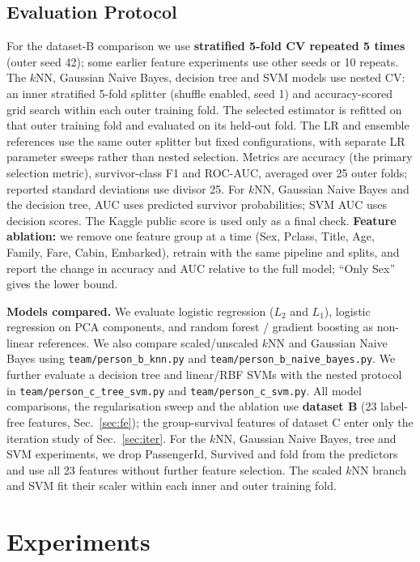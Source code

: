\documentclass[10pt,twocolumn]{article}
\begin{document}
\subsection{Evaluation Protocol}
For the dataset-B comparison we use \textbf{stratified 5-fold CV repeated 5 times} (outer seed 42); some earlier feature experiments use other seeds or 10 repeats. The $k$NN, Gaussian Naive Bayes, decision tree and SVM models use nested CV: an inner stratified 5-fold splitter (shuffle enabled, seed 1) and accuracy-scored grid search within each outer training fold. The selected estimator is refitted on that outer training fold and evaluated on its held-out fold. The LR and ensemble references use the same outer splitter but fixed configurations, with separate LR parameter sweeps rather than nested selection. Metrics are accuracy (the primary selection metric), survivor-class F1 and ROC-AUC, averaged over 25 outer folds; reported standard deviations use divisor 25. For $k$NN, Gaussian Naive Bayes and the decision tree, AUC uses predicted survivor probabilities; SVM AUC uses decision scores. The Kaggle public score is used only as a final check. \textbf{Feature ablation:} we remove one feature group at a time (Sex, Pclass, Title, Age, Family, Fare, Cabin, Embarked), retrain with the same pipeline and splits, and report the change in accuracy and AUC relative to the full model; ``Only Sex'' gives the lower bound.

\textbf{Models compared.} We evaluate logistic regression ($L_2$ and $L_1$), logistic regression on PCA components, and random forest / gradient boosting as non-linear references.
We also compare scaled/unscaled $k$NN and Gaussian Naive Bayes using \texttt{team/person\_b\_knn.py} and \texttt{team/person\_b\_naive\_bayes.py}.
We further evaluate a decision tree and linear/RBF SVMs with the nested protocol in \texttt{team/person\_c\_tree\_svm.py} and \texttt{team/person\_c\_svm.py}.
All model comparisons, the regularisation sweep and the ablation use \textbf{dataset B} (23 label-free features, Sec.~\ref{sec:fe}); the group-survival features of dataset C enter only the iteration study of Sec.~\ref{sec:iter}.
For the $k$NN, Gaussian Naive Bayes, tree and SVM experiments, we drop PassengerId, Survived and fold from the predictors and use all 23 features without further feature selection.
The scaled $k$NN branch and SVM fit their scaler within each inner and outer training fold.

\section{Experiments}
\end{document}
